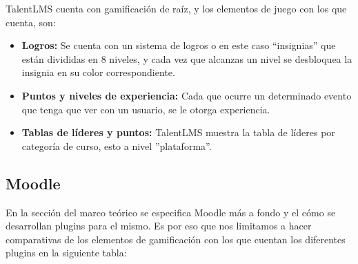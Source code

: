 \begin{multicols}{2}
    \noindent TalentLMS cuenta con gamificación de raíz,
    y los elementos de juego con los que cuenta, son:
    
    \begin{itemize} 
    
        \item {\bf Logros:} Se cuenta con un sistema de logros o en este caso
        ``insignias'' que están divididas en 8 niveles, y cada vez que alcanzas
        un nivel se desbloquea la insignia en su color correspondiente.
        
        \item {\bf Puntos y niveles de experiencia:} Cada que ocurre un
        determinado evento que tenga que ver con un usuario, se le otorga experiencia.
        
        \item {\bf Tablas de líderes y puntos:} TalentLMS muestra la
        tabla de líderes por categoría de curso, esto a nivel ''plataforma''.
        
    \end{itemize}
    
\end{multicols}



\clearpage
\subsection{Moodle}
   
En la sección del marco teórico se especifica Moodle más a fondo y el cómo se desarrollan plugins para el mismo. Es por eso que nos limitamos a hacer comparativas de los elementos de gamificación con los que cuentan los diferentes plugins en la siguiente tabla:

   

 
